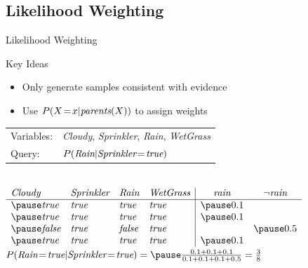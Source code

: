 \documentclass[12pt]{beamer}
\newcommand{\EM}[1]{\mbox{\em#1}}
\newcommand{\tab}{\hspace{1em}}
\begin{document}
\subsection{Likelihood Weighting}
\begin{frame}{Likelihood Weighting}
	\begin{block}{Key Ideas}
		\begin{itemize}
			\item Only generate samples consistent with evidence
			\item Use $P(X\!=\!x|\EM{parents}(X))$ to assign weights
		\end{itemize}
	\end{block}
	\medskip
	\pause
	\begin{tabular}{ll}
		Variables: & \EM{Cloudy}, \EM{Sprinkler}, \EM{Rain}, \EM{WetGrass} \\
		Query:     & $P(\EM{Rain}|\EM{Sprinkler}\!=\!\EM{true})$
	\end{tabular}
	\\
	\smallskip
	$
	\begin{array}{llll|cc}
		\EM{Cloudy} & \EM{Sprinkler} & \EM{Rain}  & \EM{WetGrass} & \EM{rain}  & \lnot\EM{rain} \\
		\hline
		\pause
		\EM{true}   & \EM{true}      & \EM{true}  & \EM{true}     & \pause 0.1 &                \\
		\pause
		\EM{true}   & \EM{true}      & \EM{true}  & \EM{true}     & \pause 0.1 &                \\
		\pause
		\EM{false}  & \EM{true}      & \EM{false} & \EM{true}     &            & \pause 0.5     \\
		\pause
		\EM{true}   & \EM{true}      & \EM{true}  & \EM{true}     & \pause 0.1 &                \\
	\end{array}
	$
	\\
	\smallskip
	\pause
	\tab$P(\EM{Rain}\!=\!\EM{true}|\EM{Sprinkler}\!=\!\EM{true})=\pause\frac{0.1 + 0.1 + 0.1}{0.1 + 0.1 + 0.1 + 0.5} = \frac{3}{8}$
\end{frame}
\end{document}

